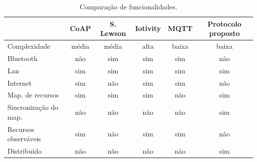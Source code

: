 \begin{table}[htb!]
    \centering
    \caption{Comparação de funcionalidades.}
    \begin{tabular}{|l|c|c|c|c|c|}
    \hline
                                   & CoAP  & S. Lewson & Iotivity & MQTT  & Protocolo proposto \\ \hline
    Complexidade                   & média & média     & alta     & baixa & baixa              \\ \hline
    Bluetooth                      & não   & sim       & sim      & sim   & não                \\ \hline
    Lan                            & sim   & sim       & sim      & sim   & sim                \\ \hline
    Internet                       & sim   & não       & sim      & sim   & não                \\ \hline
    Map. de recursos               & sim   & sim       & sim      & não   & sim                \\ \hline
    Sincronização do map.          & não   & não       & não      & não   & sim                \\ \hline
    Recursos observáveis           & sim   & não       & sim      & sim   & não                \\ \hline
    Distribuído                    & não   & não       & não      & não   & sim                \\ \hline
    \end{tabular}
    \label{table:tab1}
\end{table}
